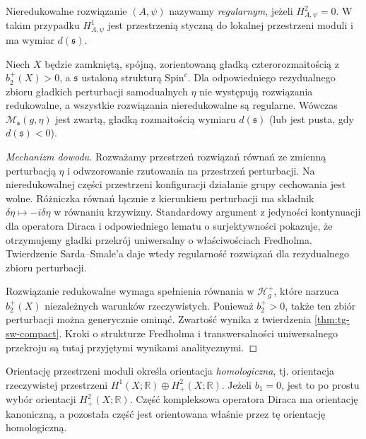 \begin{definicja}
Nieredukowalne rozwiązanie $(A,\psi)$ nazywamy
\emph{regularnym}, jeżeli $H^2_{A,\psi}=0$.
W takim przypadku $H^1_{A,\psi}$ jest przestrzenią
styczną do lokalnej przestrzeni moduli i ma wymiar
$d(\mathfrak s)$.
\end{definicja}

\begin{twierdzenie}
\label{thm:tg-sw-generic}
Niech $X$ będzie zamkniętą, spójną, zorientowaną
gładką czterorozmaitością z $b_2^+(X)>0$,
a $\mathfrak s$ ustaloną strukturą $\mathrm{Spin}^c$.
Dla odpowiedniego rezydualnego zbioru gładkich perturbacji
samodualnych $\eta$ nie występują rozwiązania redukowalne,
a wszystkie rozwiązania nieredukowalne są regularne.
Wówczas $\mathcal M_{\mathfrak s}(g,\eta)$ jest zwartą,
gładką rozmaitością wymiaru $d(\mathfrak s)$
(lub jest pusta, gdy $d(\mathfrak s)<0$).
\end{twierdzenie}

\begin{proof}[Mechanizm dowodu]
Rozważamy przestrzeń rozwiązań równań ze zmienną
perturbacją $\eta$ i odwzorowanie rzutowania na przestrzeń
perturbacji. Na nieredukowalnej części przestrzeni konfiguracji
działanie grupy cechowania jest wolne. Różniczka równań
łącznie z kierunkiem perturbacji ma składnik
$\delta\eta\mapsto-i\delta\eta$ w równaniu krzywizny.
Standardowy argument z jedyności kontynuacji dla operatora
Diraca i odpowiedniego lematu o surjektywności pokazuje,
że otrzymujemy gładki przekrój uniwersalny o właściwościach
Fredholma. Twierdzenie Sarda--Smale'a daje wtedy regularność
rozwiązań dla rezydualnego zbioru perturbacji.

Rozwiązanie redukowalne wymaga spełnienia równania w
$\mathcal H_g^+$, które narzuca $b_2^+(X)$ niezależnych
warunków rzeczywistych. Ponieważ $b_2^+>0$, także ten
zbiór perturbacji można generycznie ominąć.
Zwartość wynika z twierdzenia \ref{thm:tg-sw-compact}.
Kroki o strukturze Fredholma i transwersalności uniwersalnego
przekroju są tutaj przyjętymi wynikami analitycznymi.
\end{proof}

Orientację przestrzeni moduli określa orientacja
\emph{homologiczna}, tj. orientacja rzeczywistej
przestrzeni $H^1(X;\mathbb R)\oplus H^2_+(X;\mathbb R)$.
Jeżeli $b_1=0$, jest to po prostu wybór orientacji
$H^2_+(X;\mathbb R)$. Część kompleksowa operatora Diraca
ma orientację kanoniczną, a pozostała część jest orientowana
właśnie przez tę orientację homologiczną.

